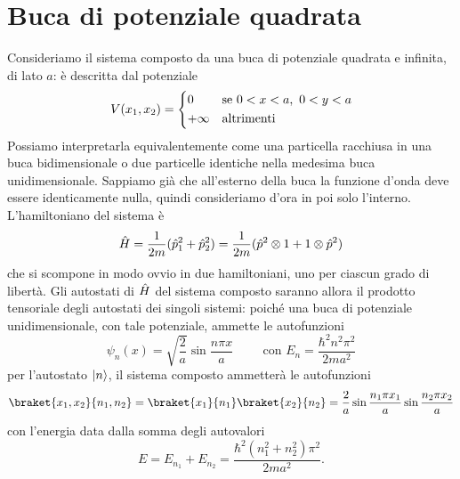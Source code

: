 \section{Buca di potenziale quadrata}
Consideriamo il sistema composto da una buca di potenziale quadrata e infinita, di lato $a$: è descritta dal potenziale
\begin{equation}
	V(x_1,x_2)=
	\begin{cases*}
		0		&se $0<x<a,\ 0<y<a$\\
		+\infty	&altrimenti
	\end{cases*}
\end{equation}
Possiamo interpretarla equivalentemente come una particella racchiusa in una buca bidimensionale o due particelle identiche nella medesima buca unidimensionale.
Sappiamo già che all'esterno della buca la funzione d'onda deve essere identicamente nulla, quindi consideriamo d'ora in poi solo l'interno.
L'hamiltoniano del sistema è
\begin{equation}
	\hat{H}=\frac1{2m}(\hat{p}_1^2+\hat{p}_2^2)=\frac1{2m}(\hat{p}^2\otimes 1+1\otimes\hat{p}^2)
\end{equation}
che si scompone in modo ovvio in due hamiltoniani, uno per ciascun grado di libertà.
Gli autostati di $\hat{H}$ del sistema composto saranno allora il prodotto tensoriale degli autostati dei singoli sistemi: poich\'e una buca di potenziale unidimensionale, con tale potenziale, ammette le autofunzioni
\begin{equation}
	\psi_n(x)=\sqrt{\frac2{a}}\sin\frac{n\pi x}{a}
	\hspace{1cm}\text{con }
	E_n=\frac{\hbar^2n^2\pi^2}{2ma^2}
\end{equation}
per l'autostato $\lvert n\rangle$, il sistema composto ammetterà le autofunzioni
\begin{equation}
	\braket{x_1,x_2}{n_1,n_2}=\braket{x_1}{n_1}\braket{x_2}{n_2}=\frac2{a}\sin\frac{n_1\pi x_1}{a}\sin\frac{n_2\pi x_2}{a}
\end{equation}
con l'energia data dalla somma degli autovalori
\begin{equation}
	E=E_{n_1}+E_{n_2}=\frac{\hbar^2(n_1^2+n_2^2)\pi^2}{2ma^2}.
\end{equation}

